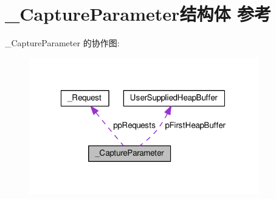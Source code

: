 \hypertarget{struct___capture_parameter}{\section{\+\_\+\+Capture\+Parameter结构体 参考}
\label{struct___capture_parameter}
}


\+\_\+\+Capture\+Parameter 的协作图\+:
\nopagebreak
\begin{figure}[H]
\begin{center}
\leavevmode
\includegraphics[width=283pt]{struct___capture_parameter__coll__graph}
\end{center}
\end{figure}
